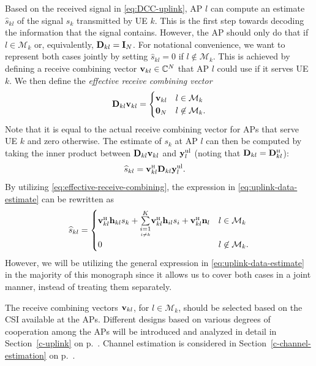 Based on the received signal in \eqref{eq:DCC-uplink}, AP $l$ can compute an estimate $\widehat{s}_{kl}$ of the signal $s_k$ transmitted by UE $k$. This is the first step towards decoding the information that the signal contains.
However, the AP should only do that if $l\in \mathcal {M}_k$ or, equivalently, $\mathbf{D}_{kl}=\mathbf{I}_N$. For notational convenience, we want to represent both cases jointly by setting $\widehat{s}_{kl}=0$ if  $l \not \in \mathcal {M}_k$.
This is achieved by defining a receive combining vector $\mathbf{v}_{kl} \in \mathbb {C}^{N}$ that AP $l$ could use if it serves UE $k$. We then define the \emph{effective receive combining vector}
\begin{equation}
\mathbf{D}_{kl} \mathbf{v}_{kl} = \begin{cases}
\mathbf{v}_{kl} & l\in \mathcal {M}_k \\
\mathbf{0}_N & l \not \in \mathcal {M}_k. \label{eq:effective-receive-combining}
\end{cases}
\end{equation}
Note that it is equal to the actual receive combining vector for APs that serve UE $k$ and zero otherwise. The estimate of $s_k$ at AP $l$ can then be computed by taking the inner product between $\mathbf{D}_{kl}  \mathbf{v}_{kl}$ and ${\bf y}_{l}^{\rm{ul}}$ (noting that $\vect{D}_{kl}= \vect{D}_{kl}^{\Htran}$):
\begin{align}
\widehat{s}_{kl} &= \vect{v}_{kl}^{\Htran} \vect{D}_{kl} {\bf y}_{l}^{\rm{ul}}\label{eq:uplink-data-estimate}.
\end{align}
By utilizing \eqref{eq:effective-receive-combining}, the expression in \eqref{eq:uplink-data-estimate} can be rewritten as
\begin{equation}
\widehat{s}_{kl} =\begin{cases}
\vect{v}_{kl}^{\Htran}  {\bf h}_{kl}s_{k} + \condSum{i=1}{i \neq k}{K} \vect{v}_{kl}^{\Htran} {\bf h}_{il}s_{i} + \vect{v}_{kl}^{\Htran} {\bf n}_{l} & l\in \mathcal {M}_k \\
0 & l \not \in \mathcal {M}_k.
\end{cases}
\label{eq:uplink-data-estimate-2}
\end{equation}
However, we will be utilizing the general expression in \eqref{eq:uplink-data-estimate} in the majority of this monograph since it allows us to cover both cases in a joint manner, instead of treating them separately.

The receive combining vectors ${\bf v}_{kl}$, for $l\in \mathcal {M}_k$, should be selected based on the \gls{CSI} available at the APs. Different designs based on various degrees of cooperation among the APs will be introduced and analyzed in detail in Section~\ref{c-uplink} on p.~\pageref{c-uplink}. Channel estimation is considered in Section~\ref{c-channel-estimation} on p.~\pageref{c-channel-estimation}.

